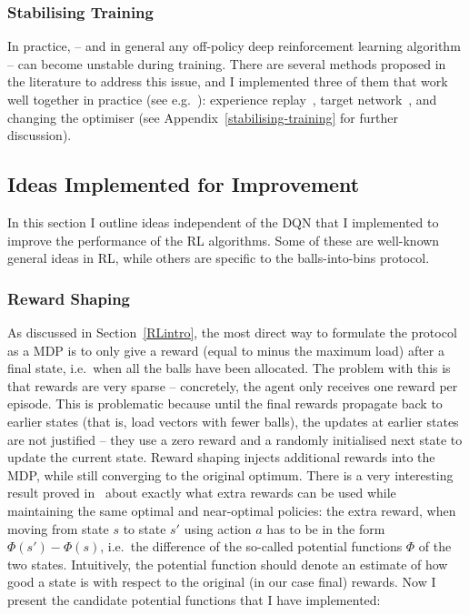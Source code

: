 \subsubsection*{Stabilising Training}


In practice, \DQL -- and in general any off-policy deep reinforcement learning algorithm -- can become unstable during training. There are several methods proposed in the literature to address this issue, and I implemented three of them that work well together in practice (see e.g.~\cite{mnih2015dqnstabilitycombined}): experience replay~\cite{lin1992experiencereplay}, target network~\cite{fan2020target}, and changing the optimiser (see Appendix~\ref{stabilising-training} for further discussion).


\subsection{Ideas Implemented for Improvement} \label{improvementideas}


In this section I outline ideas independent of the DQN that I implemented to improve the performance of the RL algorithms. Some of these are well-known general ideas in RL, while others are specific to the \TwoThinning balls-into-bins protocol.


\subsubsection*{Reward Shaping} \label{rewardshaping}

As discussed in Section~\ref{RLintro}, the most direct way to formulate the \TwoThinning protocol as a MDP is to only give a reward (equal to minus the maximum load) after a final state, i.e.\ when all the balls have been allocated. The problem with this is that rewards are very sparse -- concretely, the agent only receives one reward per episode. This is problematic because until the final rewards propagate back to earlier states (that is, load vectors with fewer balls), the updates at earlier states are not justified -- they use a zero reward and a randomly initialised next state to update the current state. Reward shaping injects additional rewards into the MDP, while still converging to the original optimum. There is a very interesting result proved in~\cite{ng1999rewardshaping} about exactly what extra rewards can be used while maintaining the same optimal and near-optimal policies: the extra reward, when moving from state $s$ to state $s'$ using action $a$ has to be in the form $\Phi(s')-\Phi(s)$, i.e.\ the difference of the so-called potential functions $\Phi$ of the two states. Intuitively, the potential function should denote an estimate of how good a state is with respect to the original (in our case final) rewards. Now I present the candidate potential functions that I have implemented:

